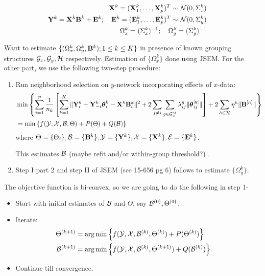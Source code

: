 \documentclass[fleqn,11pt]{article}
\DeclareMathOperator*{\argmin}{arg\,min}
\numberwithin{equation}{section}
\begin{document}
\begin{eqnarray}
{\mathbf{X}}^k = ({\mathbf{X}}^k_1, \ldots, {\mathbf{X}}^k_p)^T \sim {\cal{N}} (0, \Sigma^k_x)\\
{\mathbf{Y}}^k = {\mathbf{X}}^k {\mathbf{B}}^k + {\mathbf{E}}^k; \quad {\mathbf{E}}^k = ({\mathbf{E}}^k_1, \ldots, {\mathbf{E}}^k_p)^T \sim {\cal{N}} (0, \Sigma^k_y)\\
\Omega^k_x = (\Sigma^k_x)^{-1}; \quad \Omega^k_y = (\Sigma^k_y)^{-1}
\end{eqnarray}

Want to estimate $\{ (\Omega^k_x, \Omega^k_y, {\mathbf{B}}^k); 1 \leq k \leq K \}$ in presence of known grouping structures ${\cal{G}}_x, {\cal{G}}_y, {\cal{H}}$ respectively. Estimation of $\{ \Omega_x^k \}$ done using JSEM. For the other part, we use the following two-step procedure:

\begin{enumerate}
\item Run neighborhood selection on $y$-network incorporating effects of $x$-data:
%
\begin{align}
& \min \left\{ \sum_{i=1}^p  \frac{1}{n_k} \left[ \sum_{k=1}^K \| {\mathbf{Y}}^k_i - {\mathbf{Y}}_{-i}^k {\boldsymbol{\theta}}_i^k - {\mathbf{X}}^k {\mathbf{B}}_i^k \|^2 + 2 \sum_{j \neq i} \sum_{g \in {\cal{G}}_y^{ij}} \lambda_{ij}^g \| {\boldsymbol{\theta}}_{ij}^{[g]} \| \right] + 2 \sum_{h \in {\cal{H}}} \eta^h \| {\mathbf{B}}^{[h]} \| \right\}\\
&= \min \left\{ f ( {\cal{Y}}, {\cal{X}}, {\cal{B}}, \Theta) + P (\Theta) + Q ({\cal{B}}) \right\} 
\end{align}
%
where $\Theta = \{ \Theta_i \}, {\cal{B}} = \{ {\mathbf{B}}^k \}, {\cal{Y}} = \{ {\mathbf{Y}}^k \}, {\cal{X}} = \{ {\mathbf{X}}^k \}, {\cal{E}} = \{ {\mathbf{E}}^k \}$.

This estimates ${\cal{B}}$ { \colrbf (maybe refit and/or within-group threshold?) }.

\item Step I part 2 and step II of JSEM (see 15-656 pg 6) follows to estimate $\{ \Omega_y^k \}$.
\end{enumerate}

The objective function is bi-convex, so we are going to do the following in step 1-

\begin{itemize}
\item Start with initial estimates of ${\cal{B}}$ and $\Theta$, say ${\cal{B}}^{(0)}, \Theta^{(0)}$.
\item Iterate:
%
\begin{align}
\Theta^{(k+1)} &= \argmin \left\{ f ( \cY, \cX, \cB^{(k)}, \Theta^{(k)}) + P (\Theta^{(k)}) \right\}\\
\cB^{(k+1)} &= \argmin \left\{ f ( \cY, \cX, \cB^{(k)}, \Theta^{(k+1)}) + Q (\cB^{(k)}) \right\}
\end{align}
\item Continue till convergence.
\end{itemize}
%
\end{document}
